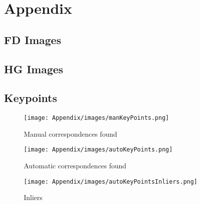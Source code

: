 \section{Appendix}
\subsection{FD Images}
\label{apx:fd}
\subsection{HG Images}
\label{apx:hg}

\subsection{Keypoints}
\label{ap:kp}
\begin{figure}[ht]
    \centering
    \texttt{[image: Appendix/images/manKeyPoints.png]}
    \caption{Manual correspondences found}
    \label{keypoints:manual}
 \end{figure}

\begin{figure}[ht]
    \centering
    \texttt{[image: Appendix/images/autoKeyPoints.png]}
    \caption{Automatic correspondences found}
    \label{keypoints:auto}
\end{figure}

\begin{figure}[ht]
    \centering
    \texttt{[image: Appendix/images/autoKeyPointsInliers.png]}
    \caption{Inliers}
    \label{keypoints:inliers}
\end{figure}
